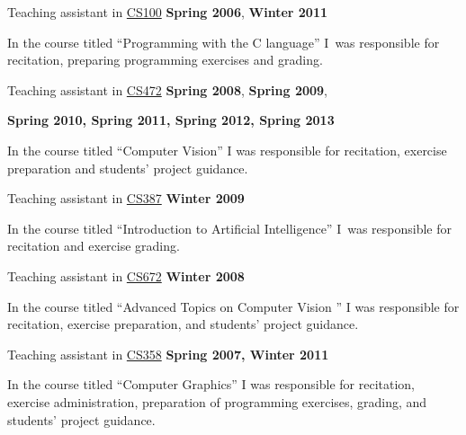 \documentclass[10pt]{article}
\newenvironment{outerlist}[1][\enskip\textbullet]%
        {\begin{itemize}[#1]}{\end{itemize}%
         \vspace{-.6\baselineskip}}
\newenvironment{innerlist}[1][\enskip\textbullet]%
        {\begin{compactitem}[#1]}{\end{compactitem}}
\begin{document}
\begin{outerlist}
        \item[] Teaching assistant in \href{http://www.csd.uoc.gr/~hy100}{CS100} \hfill \textbf{Spring 2006}, \textbf{Winter 2011}
        \begin{innerlist}
            \item In the course titled ``Programming with the C language'' I\ was responsible for recitation, preparing programming exercises and grading.
        \end{innerlist}
        
        \item[] Teaching assistant in \href{http://www.ics.forth.gr/~argyros/cs472.html}{CS472} \hfill \textbf{Spring 2008}, \textbf{Spring 2009},

 \hfill \textbf{Spring 2010, Spring 2011, Spring 2012, Spring 2013}        
        \begin{innerlist}
                \item In the course titled ``Computer Vision'' I was responsible for recitation, exercise preparation and students' project guidance.
        \end{innerlist}
        
        \item[] Teaching assistant in \href{http://elearn.uoc.gr/course/view.php?id=137}{CS387} \hfill \textbf{Winter 2009}
        \begin{innerlist}
                \item In the course titled ``Introduction to Artificial Intelligence'' I\ was responsible for recitation and exercise grading.
        \end{innerlist}

                \item[] Teaching assistant in \href{http://www.ics.forth.gr/~argyros/cs672.html}{CS672} \hfill \textbf{Winter 2008}
        \begin{innerlist}
                \item In the course titled ``Advanced Topics on Computer Vision '' I was responsible for recitation, exercise preparation, and students' project guidance.
        \end{innerlist}
        
                \item[] Teaching assistant in \href{http://www.csd.uoc.gr/~hy358}{CS358} \hfill \textbf{Spring 2007, Winter 2011}
        \begin{innerlist}
                \item In the course titled ``Computer Graphics'' I was responsible for recitation, exercise administration, preparation of programming exercises, grading, and students' project guidance.
        \end{innerlist}
        

\end{outerlist}
\end{document}
